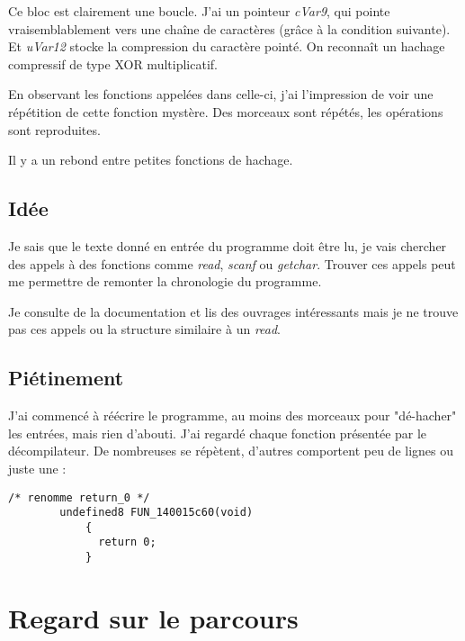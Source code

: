 \documentclass{rapport}
\begin{document}
Ce bloc est clairement une boucle. J'ai un pointeur \textit{cVar9}, qui pointe vraisemblablement vers une chaîne de caractères (grâce à la condition suivante). Et \textit{uVar12} stocke la compression du caractère pointé. On reconnaît un hachage compressif de type XOR multiplicatif.

\hspace{18pt}En observant les fonctions appelées dans celle-ci, j'ai l'impression de voir une répétition de cette fonction mystère. Des morceaux sont répétés, les opérations sont reproduites.

Il y a un rebond entre petites fonctions de hachage.

\subsection{Idée}

\hspace{18pt}Je sais que le texte donné en entrée du programme doit être lu, je vais chercher des appels à des fonctions comme \textit{read}, \textit{scanf} ou \textit{getchar}. Trouver ces appels peut me permettre de remonter la chronologie du programme.

Je consulte de la documentation et lis des ouvrages intéressants mais je ne trouve pas ces appels ou la structure similaire à un \textit{read}.


\subsection{Piétinement}

\hspace{18pt}J'ai commencé à réécrire le programme, au moins des morceaux pour "dé-hacher" les entrées, mais rien d'abouti. J'ai regardé chaque fonction présentée par le décompilateur. De nombreuses se répètent, d'autres comportent peu de lignes ou juste une : 

\begin{lstlisting}[caption={return\_0}, label={lst:fin}]
        /* renomme return_0 */
        undefined8 FUN_140015c60(void) 
            {
              return 0;
            }
\end{lstlisting}



\newpage
\section{Regard sur le parcours}
\end{document}
